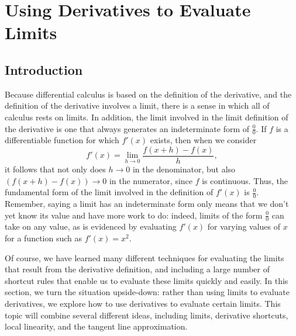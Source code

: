 \section{Using Derivatives to Evaluate Limits} \label{S:2.8.LHR}

\vspace*{-14 pt}

\subsection*{Introduction}

Because differential calculus is based on the definition of the derivative, and the definition of the derivative involves a limit, there is a sense in which all of calculus rests on limits.  In addition, the limit involved in the limit definition of the derivative is one that always generates an indeterminate form of $\frac{0}{0}$.  If $f$ is a differentiable function for which $f'(x)$ exists, then when we consider
$$f'(x) = \lim_{h \to 0} \frac{f(x+h)-f(x)}{h},$$
it follows that not only does $h \to 0$ in the denominator, but also $(f(x+h)-f(x)) \to 0$ in the numerator, since $f$ is continuous.   Thus, the fundamental form of the limit involved in the definition of $f'(x)$ is $\frac{0}{0}$.  Remember, saying a limit has an indeterminate form only means that we don't yet know its value and have more work to do:  indeed, limits of the form $\frac{0}{0}$ can take on any value, as is evidenced by evaluating $f'(x)$ for varying values of $x$ for a function such as $f'(x) = x^2$.

Of course, we have learned many different techniques for evaluating the limits that result from the derivative definition, and including a large number of shortcut rules that enable us to evaluate these limits quickly and easily.  In this section, we turn the situation upside-down:  rather than using limits to evaluate derivatives, we explore how to use derivatives to evaluate certain limits.  This topic will combine several different ideas, including limits, derivative shortcuts, local linearity, and the tangent line approximation.

